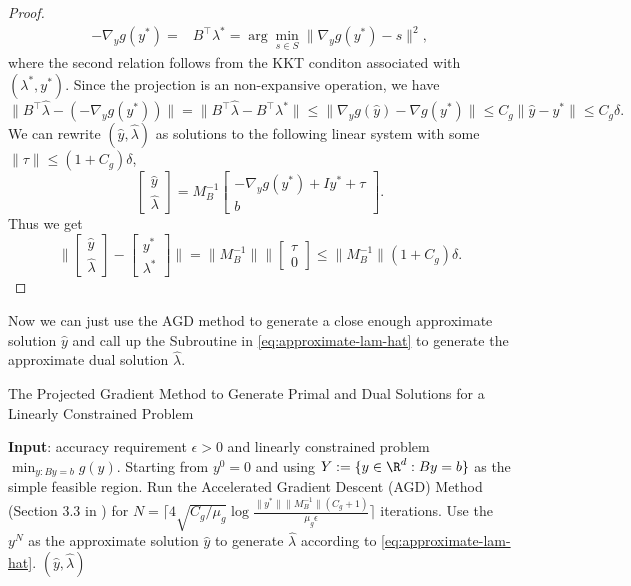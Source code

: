 \begin{proof}
\begin{align*}
     -\nabla_y g( y^*)=&B^\top \lambda^* = \arg\min_{s\in S}\|\nabla_y g( y^*) -s\|^2,
    \end{align*}
    where the second relation follows from the KKT conditon associated with $(\lambda^*,y^*)$. Since the projection is an non-expansive operation, we have 
    $$\|B^\top \hat\lambda -(- \nabla_y g(y^*))\|=\|B^\top \hat \lambda - B^\top \lambda^*\|\leq \|\nabla_y g(\hat y) -\nabla g(y^*)\|\leq C_g \|\hat y - y^*\|\leq C_g \delta.$$
    We can rewrite $(\hat y, \hat \lambda)$ as solutions to the following linear system with some $\|\tau\|\leq (1+C_g)\delta$, 
       $$ \begin{bmatrix} \hat{y} \\ \hat \lambda\end{bmatrix}
    =M_B^{-1}\begin{bmatrix}-\nabla_y g(y^*) + I y^* +\tau \\ b\end{bmatrix}.
    $$
    Thus we get 
     $$ \|\begin{bmatrix} \hat{y} \\ \hat \lambda\end{bmatrix}-\begin{bmatrix} y^* \\ \lambda^*\end{bmatrix}\|
    =\|M_B^{-1}\|\|\begin{bmatrix}\tau \\ 0\end{bmatrix}\leq \|M_B^{-1}\|(1+C_g)\delta.
    $$
    
    
\end{proof}

Now we can just use the AGD method to generate a close enough approximate solution $\hat y$ and call up the Subroutine in \cref{eq:approximate-lam-hat} to generate the approximate dual solution $\hat \lambda.$

\begin{algorithm}[h]\caption{The Projected Gradient Method to Generate Primal and Dual Solutions for a Linearly Constrained Problem}\label{alg:LE-approximate-prima-dual-solution}
\begin{algorithmic}[1]
\State \textbf{Input}: accuracy requirement $\epsilon>0$ and linearly constrained problem $\min_{y: By =b} g(y)$.
 \State Starting from $y^0=0$ and using $Y:=\{y\in\R^d: By=b\}$ as the simple feasible region. 
 \State Run the Accelerated Gradient Descent (AGD) Method (Section 3.3 in \cite{lan2020first}) for $N=\lceil 4\sqrt{C_g/\mu_g}\log\frac{\|y^*\| \|M^{-1}_B\|(C_g+1)}{\mu_g\epsilon} \rceil$ iterations.
  \State Use the $y^N$ as the approximate solution $\hat y$ to generate $\hat \lambda$ according to \cref{eq:approximate-lam-hat}.
  \State \Return $(\hat y, \hat \lambda)$
\end{algorithmic}
\end{algorithm}


